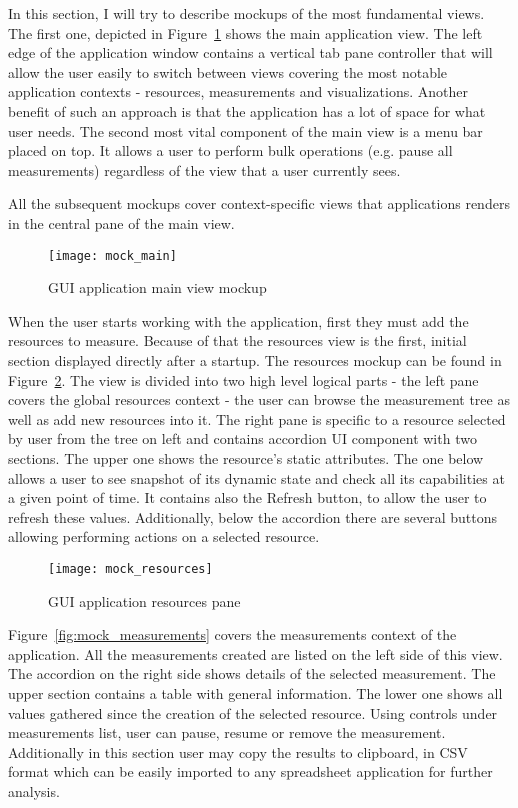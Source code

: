 In this section, I will try to describe mockups of the most fundamental views. The first one, depicted in Figure~\ref{fig:mock_main} shows the main application view. The left edge of the application window contains a vertical tab pane controller that will allow the user easily to switch between views covering the most notable application contexts - resources, measurements and visualizations. Another benefit of such an approach is that the application has a lot of space for what user needs. The second most vital component of the main view is a menu bar placed on top. It allows a user to perform bulk operations (e.g. pause all measurements) regardless of the view that a user currently sees.

All the subsequent mockups cover context-specific views that applications renders in the central pane of the main view.

\begin{figure}[ht]
\centering
\texttt{[image: mock\_main]}
\caption{GUI application main view mockup}
\label{fig:mock_main}
\end{figure}

When the user starts working with the application, first they must add the resources to measure. Because of that the resources view is the first, initial section displayed directly after a startup. The resources mockup can be found in Figure~\ref{fig:mock_resources}. The view is divided into two high level logical parts - the left pane covers the global resources context - the user can browse the measurement tree as well as add new resources into it. The right pane is specific to a resource selected by user from the tree on left and contains accordion UI component with two sections. The upper one shows the resource\rq{}s static attributes. The one below allows a user to see snapshot of its dynamic state and check all its capabilities at a given point of time. It contains also the Refresh button, to allow the user to refresh these values. Additionally, below the accordion there are several buttons allowing performing actions on a selected resource.

\begin{figure}[ht]
\centering
\texttt{[image: mock\_resources]}
\caption{GUI application resources pane}
\label{fig:mock_resources}
\end{figure}

Figure~\ref{fig:mock_measurements} covers the measurements context of the application. All the measurements created are listed on the left side of this view. The accordion on the right side shows details of the selected measurement. The upper section contains a table with general information. The lower one shows all values gathered since the creation of the selected resource. Using controls under measurements list, user can pause, resume or remove the measurement. Additionally in this section user may copy the results to clipboard, in CSV format which can be easily imported to any spreadsheet application for further analysis.

